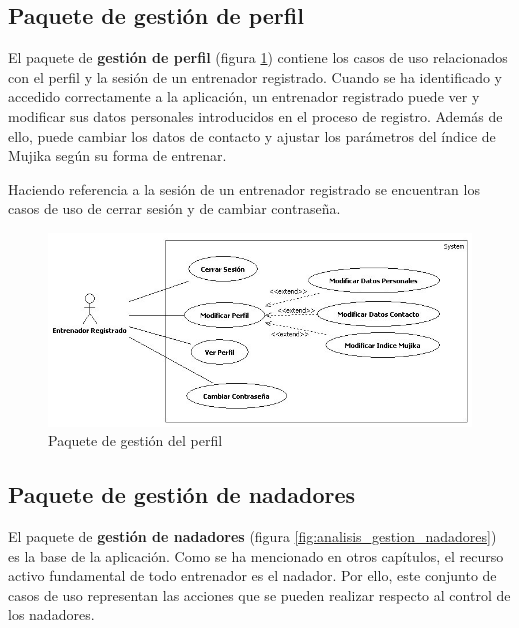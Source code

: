 	\subsection{Paquete de gestión de perfil} %
		\label{sub:paquete_de_gestion_de_perfil}
	
		El paquete de {\bf gestión de perfil} (figura \ref{fig:analisis_gestion_perfil}) contiene los casos de uso relacionados con el perfil y la sesión de un entrenador registrado. Cuando se ha identificado y accedido correctamente a la aplicación, un entrenador registrado puede ver y modificar sus datos personales introducidos en el proceso de registro. Además de ello, puede cambiar los datos de contacto y ajustar los parámetros del índice de Mujika según su forma de entrenar.
		
		Haciendo referencia a la sesión de un entrenador registrado se encuentran los casos de uso de cerrar sesión y de cambiar contraseña. 
		
		\begin{figure}[H]
		  \centering
		    \includegraphics[width=15.5cm]{./eps/casos_uso/gestion_perfil.eps}
		  \caption{Paquete de gestión del perfil}
		  \label{fig:analisis_gestion_perfil}
		\end{figure}
		
	
	\subsection{Paquete de gestión de nadadores} %
		\label{sub:paquete_de_gestion_de_nadadores}
		
		El paquete de {\bf gestión de nadadores} (figura \ref{fig:analisis_gestion_nadadores}) es la base de la aplicación. Como se ha mencionado en otros capítulos, el recurso activo fundamental de todo entrenador es el nadador. Por ello, este conjunto de casos de uso representan las acciones que se pueden realizar respecto al control de los nadadores.
		
